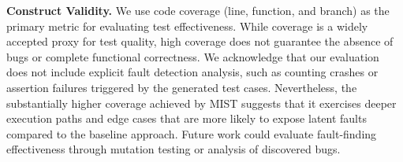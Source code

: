
\textbf{Construct Validity.} We use code coverage (line, function, and branch) as the primary metric for evaluating test effectiveness. While coverage is a widely accepted proxy for test quality, high coverage does not guarantee the absence of bugs or complete functional correctness. We acknowledge that our evaluation does not include explicit fault detection analysis, such as counting crashes or assertion failures triggered by the generated test cases. Nevertheless, the substantially higher coverage achieved by MIST suggests that it exercises deeper execution paths and edge cases that are more likely to expose latent faults compared to the baseline approach. Future work could evaluate fault-finding effectiveness through mutation testing or analysis of discovered bugs.